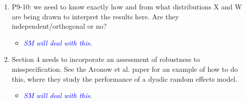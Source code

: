 \begin{enumerate}
\begin{itemize}
{{		}}
	\end{itemize}
	\item P9-10: we need to know exactly how and from what distributions X and W are being drawn to interpret the results here.  Are they independent/orthogonal or no?
	\begin{itemize}
		\item \textcolor{blue}{ \emph{
		SM will deal with this.
		}}
	\end{itemize}
	\item Section 4 needs to incorporate an assessment of robustness to misspecification.  See the Aronow et al. paper for an example of how to do this, where they study the performance of a dyadic random effects model.
	\begin{itemize}
		\item \textcolor{blue}{ \emph{
		SM will deal with this.
		}}
	\end{itemize}
\end{enumerate}
